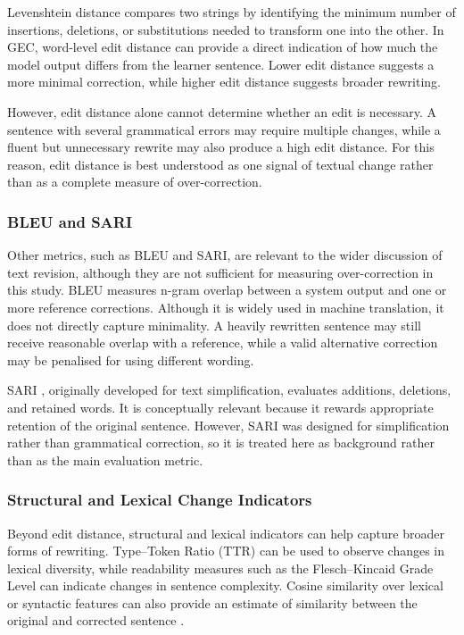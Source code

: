 Levenshtein distance \cite{levenshtein1966binary} compares two strings by identifying the minimum number of insertions, deletions, or substitutions needed to transform one into the other. In GEC, word-level edit distance can provide a direct indication of how much the model output differs from the learner sentence. Lower edit distance suggests a more minimal correction, while higher edit distance suggests broader rewriting.

However, edit distance alone cannot determine whether an edit is necessary. A sentence with several grammatical errors may require multiple changes, while a fluent but unnecessary rewrite may also produce a high edit distance. For this reason, edit distance is best understood as one signal of textual change rather than as a complete measure of over-correction.

\subsubsection{BLEU and SARI}

Other metrics, such as BLEU and SARI, are relevant to the wider discussion of text revision, although they are not sufficient for measuring over-correction in this study. BLEU \cite{papineni2002bleu} measures n-gram overlap between a system output and one or more reference corrections. Although it is widely used in machine translation, it does not directly capture minimality. A heavily rewritten sentence may still receive reasonable overlap with a reference, while a valid alternative correction may be penalised for using different wording.

SARI \cite{xu2016optimizing}, originally developed for text simplification, evaluates additions, deletions, and retained words. It is conceptually relevant because it rewards appropriate retention of the original sentence. However, SARI was designed for simplification rather than grammatical correction, so it is treated here as background rather than as the main evaluation metric.

\subsubsection{Structural and Lexical Change Indicators}

Beyond edit distance, structural and lexical indicators can help capture broader forms of rewriting. Type--Token Ratio (TTR) can be used to observe changes in lexical diversity, while readability measures such as the Flesch--Kincaid Grade Level \cite{kincaid1975derivation} can indicate changes in sentence complexity. Cosine similarity over lexical or syntactic features can also provide an estimate of similarity between the original and corrected sentence \cite{koppel2009computational}.

